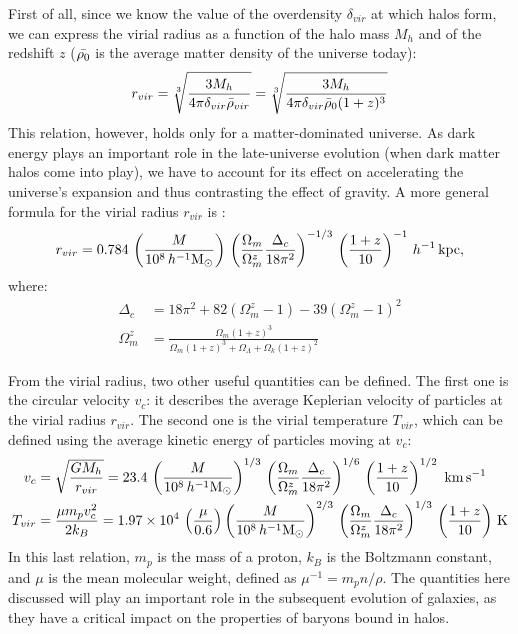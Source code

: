  First of all, since we know the value of the overdensity $\delta_{vir}$ at which halos form, we can express the virial radius as a function of the halo mass $M_h$ and of the redshift $z$ ($\Bar{\rho_0}$ is the average matter density of the universe today):
  \begin{align}
    r_{vir} = \sqrt[3]{\frac{3M_h}{4\pi\delta_{vir}\Bar{\rho}_{vir}}}=\sqrt[3]{\frac{3M_h}{4\pi\delta_{vir}\Bar{\rho}_0(1+z)^3}}
  \end{align}
  This relation, however, holds only for a matter-dominated universe. As dark energy plays an important role in the late-universe evolution (when dark matter halos come into play), we have to account for its effect on accelerating the universe's expansion and thus contrasting the effect of gravity. A more general formula for the virial radius $r_{vir}$ is \citep{bryan1998statistical}:
  \begin{align}
    r_{vir} = 0.784 \,\left(\frac{M}{10^8\,h^{-1}{\rm M}_{\odot}}\right)\,\left(\frac{\Omega_m}{\Omega^z_m}\frac{\Delta_c}{18\pi^2}\right)^{-1/3}\,\left(\frac{1+z}{10}\right)^{-1}\,h^{-1}\,\mathrm{kpc},
  \end{align}
  where:
  \begin{align}
    \Delta_c &= 18\pi^2 + 82 (\Omega^z_m-1) - 39(\Omega^z_m-1)^2\\
    \Omega^z_m &= \frac{\Omega_m(1+z)^3}{\Omega_m(1+z)^3+\Omega_\Lambda+\Omega_k(1+z)^2}
  \end{align}
  
  From the virial radius, two other useful quantities can be defined. The first one is the circular velocity $v_c$: it describes the average Keplerian velocity of particles at the virial radius $r_{vir}$. The second one is the virial temperature $T_{vir}$, which can be defined using the average kinetic energy of particles moving at $v_c$:
  \begin{align}
    v_{c} &= \sqrt{\frac{GM_h}{r_{vir}}} = 23.4 \,\left(\frac{M}{10^8\,h^{-1}{\rm M}_{\odot}}\right)^{1/3}\,\left(\frac{\Omega_m}{\Omega^z_m}\frac{\Delta_c}{18\pi^2}\right)^{1/6}\,\left(\frac{1+z}{10}\right)^{1/2}\,\,\rm km\,s^{-1} \label{eq:circular_velocity}\\
  T_{vir} &= \frac{\mu m_p v_c^2}{2k_B} = 1.97\times10^4 \,\left(\frac{\mu}{0.6}\right)\left(\frac{M}{10^8\,h^{-1}{\rm M}_{\odot}}\right)^{2/3}\,\left(\frac{\Omega_m}{\Omega^z_m}\frac{\Delta_c}{18\pi^2}\right)^{1/3}\,\left(\frac{1+z}{10}\right)\,\mathrm{K} \label{eq:virial_temperature}
  \end{align}
  In this last relation, $m_p$ is the mass of a proton, $k_B$ is the Boltzmann constant, and $\mu$ is the mean molecular weight, defined as $\mu^{-1} = m_p n/\rho$.
  The quantities here discussed will play an important role in the subsequent evolution of galaxies, as they have a critical impact on the properties of baryons bound in halos. 
  

